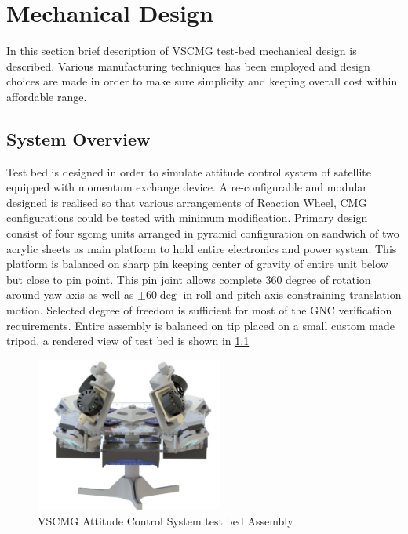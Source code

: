 \chapter{Mechanical Design}
\label{chap:7}
In this section brief description of VSCMG test-bed mechanical design is described. Various manufacturing techniques has been employed and design choices are made in order to make sure simplicity and keeping overall cost within affordable range. 
\section{System Overview}
Test bed is designed in order to simulate attitude control system of satellite equipped with momentum exchange device. A re-configurable and modular designed is realised so that various arrangements of Reaction Wheel, CMG configurations could be tested with minimum modification. Primary design consist of four \acrshort{sgcmg} units arranged in pyramid configuration on sandwich of two acrylic sheets as main platform to hold entire electronics and power system. This platform is balanced on sharp pin keeping center of gravity of entire unit below but close to pin point. This pin joint allows complete 360 degree of rotation around yaw axis as well as $\pm 60 \deg$ in roll and pitch axis constraining translation motion. Selected degree of freedom is sufficient for most of the GNC verification requirements. Entire assembly is balanced on tip placed on a small custom made tripod, a rendered view of test bed is shown in \ref{fig:my_AssemblyACR}

\begin{figure}[ht]
    \centering
    \includegraphics[width=0.55\textwidth]{figures/Assembly/AssemblyACR - Transperent.pdf}
    \caption{VSCMG Attitude Control System test bed Assembly }
    \label{fig:my_AssemblyACR}
\end{figure}

